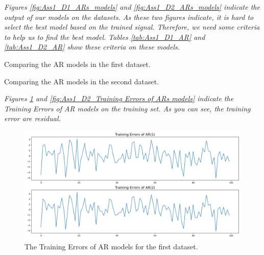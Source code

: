 \textit{Figures \ref{fig:Ass1_D1_ARs_models} and \ref{fig:Ass1_D2_ARs_models} indicate the output of our models on the datasets. As these two figures indicate, it is hard to select the best model based on the trained signal. Therefore, we need some criteria to help us to find the best model. Tables \ref{tab:Ass1_D1_AR} and \ref{tab:Ass1_D2_AR} show these criteria on these models. }

\begin{table}[H]
\centering
\caption{Comparing the \gls{AR} models in the first dataset.}
\label{tab:Ass1_D1_AR}

\end{table}

\begin{table}[H]
\centering
\caption{Comparing the \gls{AR} models in the second dataset.}
\label{tab:Ass1_D2_AR}

\end{table}

\textit{Figures \ref{fig:Ass1_D1_Training Errors of ARs models} and \ref{fig:Ass1_D2_Training Errors of ARs models} indicate the Training Errors of \gls{AR} models on the training set. As you can see, the training error are residual.}


\begin{figure}[H]
    \centering
    \begin{minipage}[b]{1\textwidth}
        \includegraphics[width=\textwidth]{figures/Ass1/Ass1_D1_Training Errors of ARs models.png}
    \end{minipage}
    \caption{The Training Errors of AR models for the first dataset. }
    \label{fig:Ass1_D1_Training Errors of ARs models}
\end{figure}

